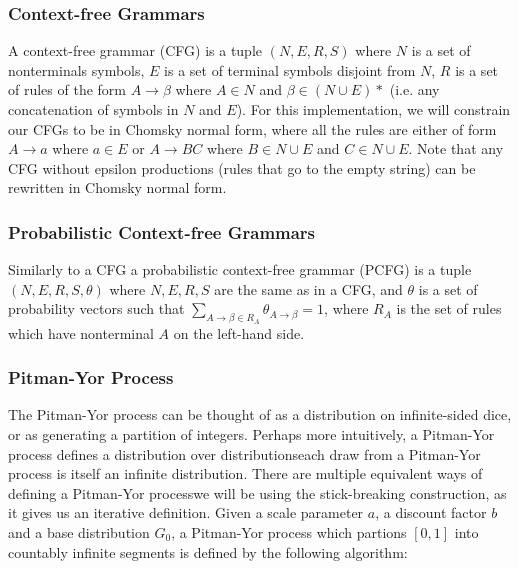 \documentclass[12pt,letterpaper]{article}
\begin{document}
\subsubsection{Context-free Grammars}
A context-free grammar (CFG) is a tuple $(N, E, R, S)$ where $N$ is a set of nonterminals symbols, $E$ is a set of terminal symbols disjoint from $N$, $R$ is a set of rules of the form $A \rightarrow \beta$ where $A \in N$ and $\beta \in (N \cup E)*$ (i.e. any concatenation of symbols in $N$ and $E$). For this implementation, we will constrain our CFGs to be in Chomsky normal form, where all the rules are either of form $A \rightarrow a$ where $a \in E$ or $A \rightarrow BC$ where $B\in N\cup E$ and $C\in N\cup E$. Note that any CFG without epsilon productions (rules that go to the empty string) can be rewritten in Chomsky normal form. \citep{hopcroft:2006}  

\subsubsection{Probabilistic Context-free Grammars}
Similarly to a CFG a probabilistic context-free grammar (PCFG) is a tuple $(N, E, R, S, \theta)$ where $N,E,R,S$ are the same as in a CFG, and $\theta$ is a set of probability vectors such that $\sum\limits_{A\rightarrow \beta \in R_A} \theta_{A\rightarrow \beta} = 1$, where $R_A$ is the set of rules which have nonterminal $A$ on the left-hand side. 

\subsubsection{Pitman-Yor Process}
The Pitman-Yor process \citep{pitman:1997} can be thought of as a distribution on infinite-sided dice, or as generating a partition of integers. Perhaps more intuitively, a Pitman-Yor process defines a distribution over distributions\textemdash each draw from a Pitman-Yor process is itself an infinite distribution. There are multiple equivalent ways of defining a Pitman-Yor process\textemdash we will be using the stick-breaking construction, as it gives us an iterative definition. Given a scale parameter $a$, a discount factor $b$ and a base distribution $G_0$, a Pitman-Yor process which partions $[0,1]$ into countably infinite segments is defined by the following algorithm:\\
\end{document}
